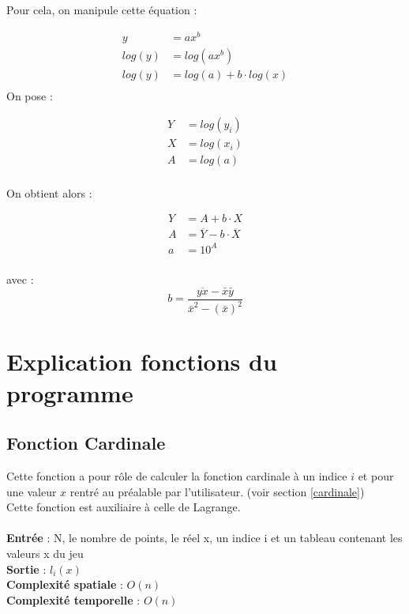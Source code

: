 \documentclass[12pt,french,titlepage]{article}
\begin{document}
	Pour cela, on manipule cette équation :
	
	\begin{align*}
		y&=ax^b\\
		log (y)&=log(ax^b)\\
		log(y)&=log(a)+b\cdot log(x)\\
	\end{align*}
	On pose :
	
	\begin{align*}
	Y&=log(y_i)\\
	X&=log(x_i)\\
	A&=log(a)\\
	\end{align*}
	
	On obtient alors :
	
	\begin{align*}
	Y&=A+b\cdot X\\
	A&=\overline{Y}-b\cdot \overline{X}\\
	a&=10^A\\
	\end{align*}
	
	avec :
	\begin{equation*}
		b=\frac{\overline{yx}-\bar{x}\bar{y}}{\bar{x}^2-(\bar{x})^2}
	\end{equation*}
	
	
	\section{Explication fonctions du programme}
	
	\subsection{Fonction Cardinale}
	
	
	\medskip
	Cette fonction a pour rôle de calculer la fonction cardinale à un indice $i$ et pour une valeur $x$ rentré au préalable par l'utilisateur. (voir section \ref{cardinale}) \\
	Cette fonction est auxiliaire à celle de Lagrange.\\\\
	\textbf{Entrée} : N, le nombre de points, le réel x, un indice i et un tableau contenant les valeurs x du jeu\\
	\textbf{Sortie} : $l_i(x)$\\
	\textbf{Complexité spatiale} : $O(n)$\\
	\textbf{Complexité temporelle} : $O(n)$\\
\end{document}
